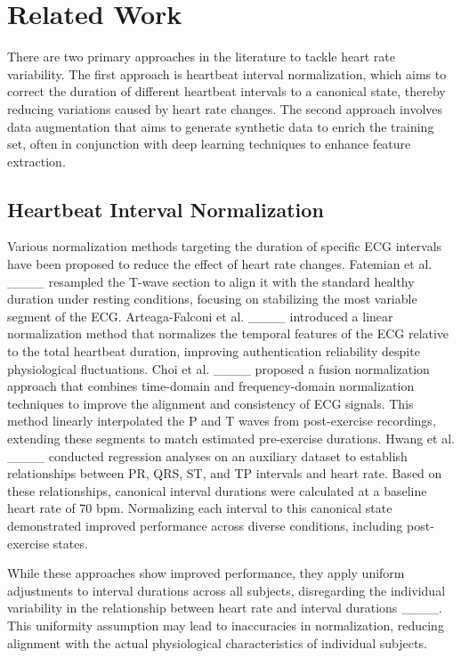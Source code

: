 \section{Related Work}

There are two primary approaches in the literature to tackle heart rate variability. The first approach is heartbeat interval normalization, which aims to correct the duration of different heartbeat intervals to a canonical state, thereby reducing variations caused by heart rate changes. The second approach involves data augmentation that aims to generate synthetic data to enrich the training set, often in conjunction with deep learning techniques to enhance feature extraction. 

\subsection{Heartbeat Interval Normalization}
Various normalization methods targeting the duration of specific ECG intervals have been proposed to reduce the effect of heart rate changes.
Fatemian et al. ____ resampled the T-wave section to align it with the standard healthy duration under resting conditions, focusing on stabilizing the most variable segment of the ECG.
Arteaga-Falconi et al. ____ introduced a linear normalization method that normalizes the temporal features of the ECG relative to the total heartbeat duration, improving authentication reliability despite physiological fluctuations.
Choi et al. ____ proposed a fusion normalization approach that combines time-domain and frequency-domain normalization techniques to improve the alignment and consistency of ECG signals. This method linearly interpolated the P and T waves from post-exercise recordings, extending these segments to match estimated pre-exercise durations.
Hwang et al. ____ conducted regression analyses on an auxiliary dataset to establish relationships between PR, QRS, ST, and TP intervals and heart rate.
Based on these relationships, canonical interval durations were calculated at a baseline heart rate of 70 bpm.
Normalizing each interval to this canonical state demonstrated improved performance across diverse conditions, including post-exercise states.

While these approaches show improved performance, they apply uniform adjustments to interval durations across all subjects, disregarding the individual variability in the relationship between heart rate and interval durations ____. This uniformity assumption may lead to inaccuracies in normalization, reducing alignment with the actual physiological characteristics of individual subjects.

